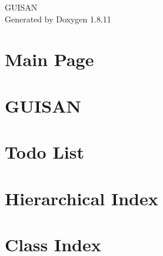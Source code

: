 \documentclass[twoside]{book}
\newcommand{\+}{\discretionary{\mbox{\scriptsize$\hookleftarrow$}}{}{}}
\newcommand{\clearemptydoublepage}{%
  \newpage{\pagestyle{empty}\cleardoublepage}%
}
\begin{document}
\hypersetup{pageanchor=false,
             bookmarksnumbered=true,
             pdfencoding=unicode
            }
\begin{titlepage}
\vspace*{7cm}
\begin{center}%
{\Large G\+U\+I\+S\+AN }\\
\vspace*{1cm}
{\large Generated by Doxygen 1.8.11}\\
\end{center}
\end{titlepage}
\clearemptydoublepage
\tableofcontents
\clearemptydoublepage
{}
\hypersetup{pageanchor=true}

\chapter{Main Page}
\label{index}\hypertarget{index}{}
\chapter{G\+U\+I\+S\+AN}
\label{md_README}
\hypertarget{md_README}{}

\chapter{Todo List}
\label{todo}
\hypertarget{todo}{}

\chapter{Hierarchical Index}

\chapter{Class Index}

\end{document}
